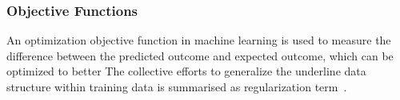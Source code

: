 \subsubsection{Objective Functions}
An optimization objective function in machine learning is used to measure the difference between the predicted outcome and expected outcome, which can be optimized to better  The collective efforts to generalize the underline data structure within training data is summarised as regularization term~\cite{goodfellow_2015}.  